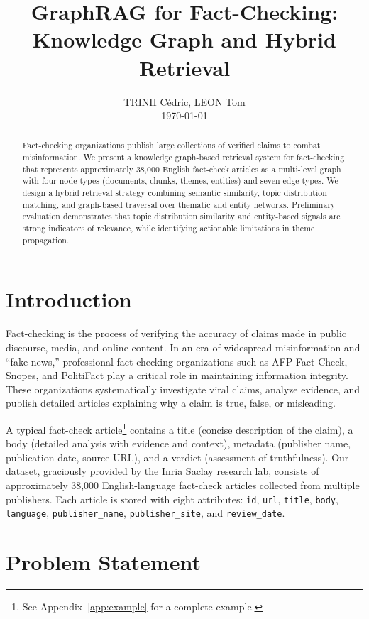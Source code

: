 \documentclass[10pt]{article}
\title{\vspace{-1.5cm}\textbf{\Large GraphRAG for Fact-Checking: \\ Knowledge Graph and Hybrid Retrieval}}
\author{
    \normalsize TRINH Cédric, LEON Tom \\
    \normalsize \today
}
\date{}
\begin{document}
\maketitle

\begin{abstract}
Fact-checking organizations publish large collections of verified claims to combat misinformation. We present a knowledge graph-based retrieval system for fact-checking that represents approximately 38,000 English fact-check articles as a multi-level graph with four node types (documents, chunks, themes, entities) and seven edge types. We design a hybrid retrieval strategy combining semantic similarity, topic distribution matching, and graph-based traversal over thematic and entity networks. Preliminary evaluation demonstrates that topic distribution similarity and entity-based signals are strong indicators of relevance, while identifying actionable limitations in theme propagation.
\end{abstract}

\section{Introduction}

Fact-checking is the process of verifying the accuracy of claims made in public discourse, media, and online content. In an era of widespread misinformation and ``fake news,'' professional fact-checking organizations such as AFP Fact Check, Snopes, and PolitiFact play a critical role in maintaining information integrity. These organizations systematically investigate viral claims, analyze evidence, and publish detailed articles explaining why a claim is true, false, or misleading.

A typical fact-check article\footnote{See Appendix~\ref{app:example} for a complete example.} contains a title (concise description of the claim), a body (detailed analysis with evidence and context), metadata (publisher name, publication date, source URL), and a verdict (assessment of truthfulness). Our dataset, graciously provided by the Inria Saclay research lab, consists of approximately 38,000 English-language fact-check articles collected from multiple publishers. Each article is stored with eight attributes: \texttt{id}, \texttt{url}, \texttt{title}, \texttt{body}, \texttt{language}, \texttt{publisher\_name}, \texttt{publisher\_site}, and \texttt{review\_date}.

\section{Problem Statement}
\end{document}
